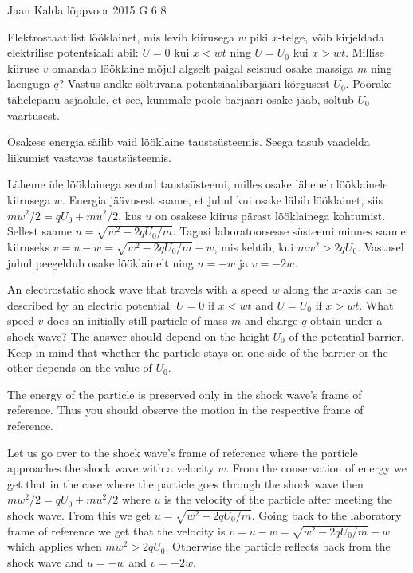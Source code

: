 {Jaan Kalda} %
{lõppvoor} %
{2015} %
{G 6} %
{8} %
{
\ifStatement
Elektrostaatilist lööklainet, mis levib kiirusega $w$ piki $x$-telge, võib kirjeldada elektrilise potentsiaali abil: $U=0$ kui $x<wt$ ning $U=U_0$ kui $x>wt$. Millise kiiruse $v$ omandab lööklaine mõjul algselt paigal seisnud osake massiga $m$ ning laenguga $q$? Vastus andke sõltuvana potentsiaalibarjääri kõrgusest $U_0$. Pöörake tähelepanu asjaolule, et see, kummale poole barjääri osake jääb, sõltub $U_0$ väärtusest. 
\fi


\ifHint
Osakese energia säilib vaid lööklaine taustsüsteemis. Seega tasub vaadelda liikumist vastavas taustsüsteemis.
\fi


\ifSolution
Läheme üle lööklainega seotud taustsüsteemi, milles osake läheneb lööklainele kiirusega $w$. Energia jäävusest saame, et juhul kui osake läbib lööklainet, siis $mw^2/2=qU_0+mu^2/2$, kus $u$ on osakese kiirus pärast lööklainega kohtumist. Sellest saame $u=\sqrt{w^2-2qU_0/m}$. Tagasi laboratoorsesse süsteemi 
minnes saame kiiruseks $v=u-w=\sqrt{w^2-2qU_0/m}-w$, mis kehtib, kui $mw^2>2qU_0$. Vastasel juhul peegeldub osake lööklainelt ning
$u=-w$ ja $v=-2w$.
\fi


\ifEngStatement
An electrostatic shock wave that travels with a speed $w$ along the $x$-axis can be described by an electric potential: $U=0$ if $x<wt$ and $U=U_0$ if $x>wt$. What speed $v$ does an initially still particle of mass $m$ and charge $q$ obtain under a shock wave? The answer should depend on the height $U_0$ of the potential barrier. Keep in mind that whether the particle stays on one side of the barrier or the other depends on the value of $U_0$.
\fi


\ifEngHint
The energy of the particle is preserved only in the shock wave’s frame of reference. Thus you should observe the motion in the respective frame of reference.
\fi


\ifEngSolution
Let us go over to the shock wave's frame of reference where the particle approaches the shock wave with a velocity $w$. From the conservation of energy we get that in the case where the particle goes through the shock wave then $mw^2/2=qU_0+mu^2/2$ where $u$ is the velocity of the particle after meeting the shock wave. From this we get $u=\sqrt{w^2-2qU_0/m}$. Going back to the laboratory frame of reference we get that the velocity is $v=u-w=\sqrt{w^2-2qU_0/m}-w$ which applies when $mw^2>2qU_0$. Otherwise the particle reflects back from the shock wave and $u=-w$ and $v=-2w$.
\fi
}